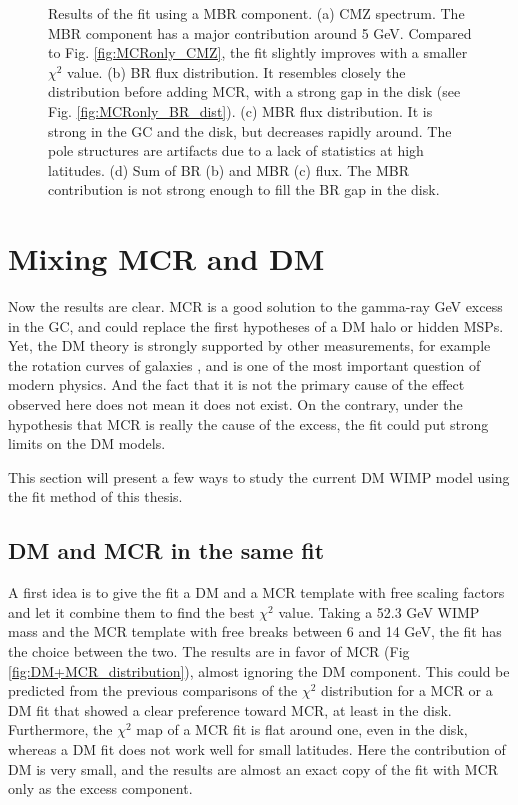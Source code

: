 \begin{figure}[H]
\begin{minipage}[h]{0.45\textwidth}
	  \subcaption{}
	  \label{}
  \end{minipage}
  \caption[Results of the fit with MBR]{Results of the fit using a MBR component. (a) CMZ spectrum. The MBR component has a major contribution around 5 GeV. Compared to Fig. \ref{fig:MCRonly_CMZ}, the fit slightly improves with a smaller $\chi^2$ value. (b) BR flux distribution. It resembles closely the distribution before adding MCR, with a strong gap in the disk (see Fig. \ref{fig:MCRonly_BR_dist}). (c) MBR flux distribution. It is strong in the GC and the disk, but decreases rapidly around. The pole structures are artifacts due to a lack of statistics at high latitudes. (d) Sum of BR (b) and MBR (c) flux. The MBR contribution is not strong enough to fill the BR gap in the disk.}
  \label{fig:MBR_results}	 
\end{figure}




\newpage
\section{Mixing MCR and DM}

Now the results are clear. MCR is a good solution to the gamma-ray GeV excess in the GC, and could replace the first hypotheses of a DM halo or hidden MSPs. Yet, the DM theory is strongly supported by other measurements, for example the rotation curves of galaxies  \cite{Newby2018} \cite{Rubin1971}, and is one of the most important question of modern physics. And the fact that it is not the primary cause of the effect observed here does not mean it does not exist. On the contrary, under the hypothesis that MCR is really the cause of the excess, the fit could put strong limits on the DM models.

This section will present a few ways to study the current DM WIMP model using the fit method of this thesis.


\subsection{DM and MCR in the same fit}

A first idea is to give the fit a DM and a MCR template with free scaling factors and let it combine them to find the best $\chi^2$ value. Taking a 52.3 GeV WIMP mass and the MCR template with free breaks between 6 and 14 GeV, the fit has the choice between the two. 
The results are in favor of MCR (Fig \ref{fig:DM+MCR_distribution}), almost ignoring the DM component. This could be predicted from the previous comparisons of the $\chi^2$ distribution for a MCR or a DM fit that showed a clear preference toward MCR, at least in the disk. Furthermore, the $\chi^2$ map of a MCR fit is flat around one, even in the disk, whereas a DM fit does not work well for small latitudes. Here the contribution of DM is very small, and the results are almost an exact copy of the fit with MCR only as the excess component.

